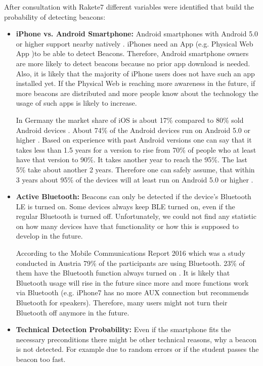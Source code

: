 \par After consultation with Rakete7 different variables were identified that build the probability of detecting beacons:
\begin{itemize}
\item \textbf{iPhone vs. Android Smartphone:} Android smartphones with Android 5.0 or higher support nearby natively \cite{googleNearby}. iPhones need an App (e.g. Physical Web App \cite{physicalWebApp})to be able to detect Beacons. Therefore, Android smartphone owners are more likely to detect beacons because no prior app download is needed. Also, it is likely that the majority of iPhone users does not have such an app installed yet. If the Physical Web is reaching more awareness in the future, if more beacons are distributed and more people know about the technology the usage of such apps is likely to increase.
\par In Germany the market share of iOS is about 17\% compared to 80\% sold Android devices \cite{iosVsAndroid}. About 74\% of the Android devices run on Android 5.0 or higher \cite{androidPlatformVersions}. Based on experience with past Android versions one can say that it takes less than 1.5 years for a version to rise from 70\% of people who at least have that version to 90\%. It takes another year to reach the 95\%. The last 5\% take about another 2 years. Therefore one can safely assume, that within 3 years about 95\% of the devices will at least run on Android 5.0 or higher \cite{androidHistorical}. 
\item \textbf{Active Bluetooth:} Beacons can only be detected if the device's Bluetooth LE is turned on. Some devices always keep BLE turned on, even if the regular Bluetooth is turned off. Unfortunately, we could not find any statistic on how many devices have that functionality or how this is supposed to develop in the future.
\par According to the Mobile Communications Report 2016 which was a study conducted in Austria 79\% of the participants are using Bluetooth. 23\% of them have the Bluetooth function always turned on \cite{bluetoothUsage}. It is likely that Bluetooth usage will rise in the future since more and more functions work via Bluetooth (e.g. iPhone7 has no more AUX connection but recommends Bluetooth for speakers). Therefore, many users might not turn their Bluetooth off anymore in the future.
\item \textbf{Technical Detection Probability:} Even if the smartphone fits the necessary preconditions there might be other technical reasons, why a beacon is not detected. For example due to random errors or if the student passes the beacon too fast.
\end{itemize} 
